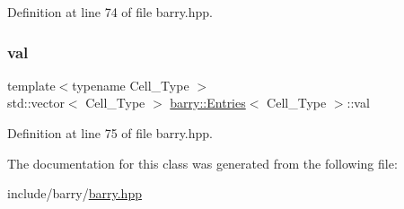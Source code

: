 Definition at line 74 of file barry.\+hpp.

\mbox{\label{classbarry_1_1_entries_af2570fcd2f42e9a1704f9c254507284c}} 
\subsubsection{\texorpdfstring{val}{val}}
{\footnotesize\ttfamily template$<$typename Cell\+\_\+\+Type $>$ \\
std\+::vector$<$ Cell\+\_\+\+Type $>$ \hyperlink{classbarry_1_1_entries}{barry\+::\+Entries}$<$ Cell\+\_\+\+Type $>$\+::val}



Definition at line 75 of file barry.\+hpp.



The documentation for this class was generated from the following file\+:\begin{DoxyCompactItemize}
\item 
include/barry/\hyperlink{barry_8hpp}{barry.\+hpp}\end{DoxyCompactItemize}
